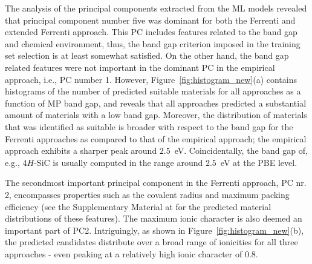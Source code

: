 \documentclass[superscriptaddress,unsortedaddress,
 amsmath,amssymb,
 aps,
]{revtex4-2}
\begin{document}
The analysis of the principal components extracted from the ML models revealed that principal component number five was dominant for both the Ferrenti and extended Ferrenti approach. This PC includes features related to the band gap and chemical environment, thus, the band gap criterion imposed in the training set selection is at least somewhat satisfied. On the other hand, the band gap related features were not important in the dominant PC in the empirical approach, i.e., PC number 1. However, Figure~\ref{fig:histogram_new}(a) contains histograms of the number of predicted suitable materials for all approaches as a function of MP band gap, and reveals that all approaches predicted a substantial amount of materials with a low band gap. Moreover, the distribution of materials that was identified as suitable is broader with respect to the band gap for the Ferrenti approaches as compared to that of the empirical approach; the empirical approach exhibits a sharper peak around $2.5$~eV.  
Coincidentally, the band gap of, e.g., 4$H$-SiC is usually computed in the range around $2.5$~eV at the PBE level. 


The secondmost important principal component in the Ferrenti approach, PC nr. 2, encompasses properties such as the covalent radius and maximum packing efficiency (see the Supplementary Material at \cite{supplementary} for the predicted material distributions of these features).  
The maximum ionic character is also deemed an important part of PC2. Intriguingly, as shown in Figure~\ref{fig:histogram_new}(b), the predicted candidates distribute over a broad range of ionicities for all three approaches - even peaking at a relatively high ionic character of $0.8$. 
\end{document}
